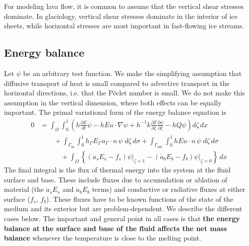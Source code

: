 \documentclass{article}
\theoremstyle{definition}
\theoremstyle{plain}
\begin{document}
For modeling lava flow, it is common to assume that the vertical shear stresses dominate.
In glaciology, vertical shear stresses dominate in the interior of ice sheets, while horizontal stresses are most important in fast-flowing ice streams.

\subsection{Energy balance}

Let $\psi$ be an arbitrary test function.
We make the simplifying assumption that diffusive transport of heat is small compared to advective transport in the horizontal directions, i.e. that the P\'eclet number is small.
We do not make this assumption in the vertical dimension, where both effects can be equally important.
The primal variational form of the energy balance equation is
\begin{align}
    0 & = \int_\Omega\int_0^1\left(h\frac{\partial E}{\partial t}\psi - hEu\cdot\nabla\psi + h^{-1}k\frac{\partial T}{\partial\zeta}\frac{\partial\psi}{\partial\zeta} - hQ\psi\right)d\zeta\,dx \nonumber\\
    & \qquad +\int_{\Gamma_{\text{in}}}\int_0^1h_\Gamma E_\Gamma u_\Gamma\cdot n\,\psi\;d\zeta\,d\sigma + \int_{\Gamma_{\text{out}}}\int_0^1 hEu\cdot n\,\psi\;d\zeta\,d\sigma \nonumber \\
    & \quad\qquad + \int_\Omega\left\{\left(\dot a_sE_s - f_s\right)\psi\big|_{\zeta = 1} - \left(\dot a_bE_b - f_b\right)\psi\big|_{\zeta = 0}\right\}\,dx
    \label{eq:energy-balance}
\end{align}
The final integral is the flux of thermal energy into the system at the fluid surface and base.
These include fluxes due to accumulation or ablation of material (the $\dot a_sE_s$ and $\dot a_bE_b$ terms) and conductive or radiative fluxes at either surface ($f_s$, $f_b$).
These fluxes have to be known functions of the state of the medium and its exterior but are problem-dependent.
We describe the different cases below.
The important and general point in all cases is that \textbf{the energy balance at the surface and base of the fluid affects the net mass balance} whenever the temperature is close to the melting point.
\end{document}
